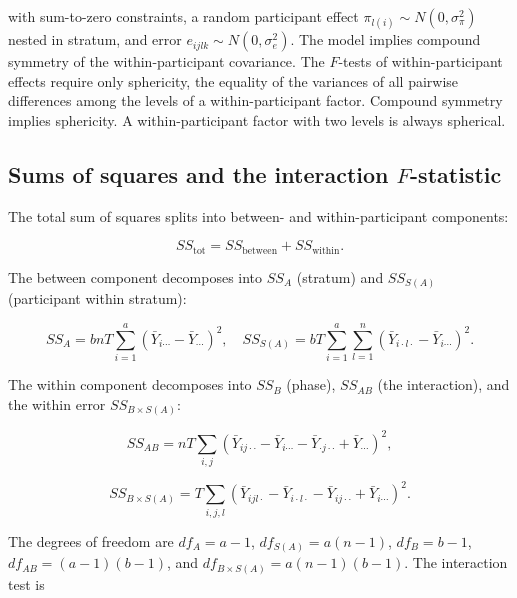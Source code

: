 \documentclass[
  11pt,
]{article}
\begin{document}
with sum-to-zero constraints, a random participant effect
\(\pi_{l(i)} \sim N(0, \sigma_\pi^2)\) nested in stratum, and error
\(e_{ijlk} \sim N(0, \sigma_e^2)\). The model implies compound
symmetry of the within-participant covariance. The \(F\)-tests of
within-participant effects require only sphericity, the equality of
the variances of all pairwise differences among the levels of a
within-participant factor. Compound symmetry implies sphericity. A
within-participant factor with two levels is always spherical.

\subsection{\texorpdfstring{Sums of squares and the interaction \(F\)-statistic}{Sums of squares and the interaction F-statistic}}\label{sums-of-squares-and-the-interaction-f-statistic}

The total sum of squares splits into between- and within-participant
components:

\begin{equation}
SS_{\text{tot}} = SS_{\text{between}} + SS_{\text{within}} .
\label{eq:rmanova-ss-partition}
\end{equation}

The between component decomposes into \(SS_A\) (stratum) and
\(SS_{S(A)}\) (participant within stratum):

\begin{equation}
SS_A = bnT \sum_{i=1}^a (\bar Y_{i\cdots} - \bar Y_{\cdots})^2,
\quad
SS_{S(A)} = bT \sum_{i=1}^a \sum_{l=1}^n
(\bar Y_{i\cdot l\cdot} - \bar Y_{i\cdots})^2 .
\label{eq:rmanova-between}
\end{equation}

The within component decomposes into \(SS_B\) (phase), \(SS_{AB}\) (the
interaction), and the within error \(SS_{B \times S(A)}\):

\begin{equation}
SS_{AB} = nT \sum_{i,j} (\bar Y_{ij\cdot\cdot}
- \bar Y_{i\cdots} - \bar Y_{\cdot j\cdot\cdot}
+ \bar Y_{\cdots})^2 ,
\label{eq:rmanova-ss-ab}
\end{equation}

\begin{equation}
SS_{B \times S(A)} = T \sum_{i,j,l} (\bar Y_{ijl\cdot}
- \bar Y_{i\cdot l\cdot} - \bar Y_{ij\cdot\cdot}
+ \bar Y_{i\cdots})^2 .
\label{eq:rmanova-ss-error}
\end{equation}

The degrees of freedom are \(df_A = a - 1\), \(df_{S(A)} = a(n-1)\),
\(df_B = b - 1\), \(df_{AB} = (a-1)(b-1)\), and \(df_{B \times S(A)} =
a(n-1)(b-1)\). The interaction test is
\end{document}
